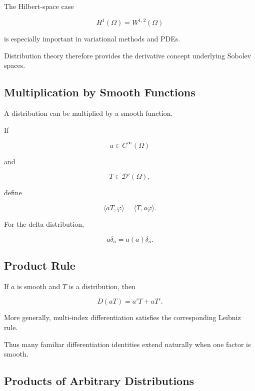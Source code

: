 The Hilbert-space case

\[
\boxed{
H^1(\Omega)
=
W^{1,2}(\Omega)
}
\]

is especially important in variational methods and PDEs.

Distribution theory therefore provides the derivative concept underlying
Sobolev spaces.

\subsection{Multiplication by Smooth Functions}
\label{subsec:multiplying-distributions}

A distribution can be multiplied by a smooth function.

If

\[
a\in C^\infty(\Omega)
\]

and

\[
T\in\mathcal{D}'(\Omega),
\]

define

\[
\boxed{
\langle aT,\varphi\rangle
=
\langle T,a\varphi\rangle.
}
\]

For the delta distribution,

\[
\boxed{
a\delta_a
=
a(a)\delta_a.
}
\]

\subsection{Product Rule}
\label{subsec:distribution-product-rule}

If \(a\) is smooth and \(T\) is a distribution, then

\[
\boxed{
D(aT)
=
a'T+aT'.
}
\]

More generally, multi-index differentiation satisfies the corresponding
Leibniz rule.

Thus many familiar differentiation identities extend naturally when one
factor is smooth.

\subsection{Products of Arbitrary Distributions}
\label{subsec:products-arbitrary-distributions}

